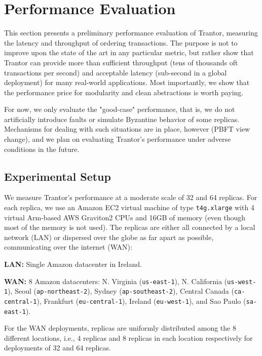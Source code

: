 \documentclass{article}
\begin{document}
\section{Performance Evaluation}
\label{sec:evaluation}

This section presents a preliminary performance evaluation of Trantor, measuring the latency and throughput of ordering transactions.
The purpose is not to improve upon the state of the art in any particular metric,
but rather show that Trantor can provide more than sufficient throughput (tens of thousands oft transactions per second)
and acceptable latency (sub-second in a global deployment) for many real-world applications.
Most importantly, we show that the performance price for modularity and clean abstractions is worth paying.

For now, we only evaluate the "good-case" performance, that is, we do not artificially introduce faults or simulate Byzantine behavior of some replicas.
Mechanisms for dealing with such situations are in place, however (PBFT view change),
and we plan on evaluating Trantor's performance under adverse conditions in the future.

\subsection{Experimental Setup}

We measure Trantor's performance at a moderate scale of 32 and 64 replicas.
For each replica, we use an Amazon EC2 virtual machine of type \texttt{t4g.xlarge}
with 4 virtual Arm-based AWS Graviton2 CPUs and 16GB of memory (even though most of the memory is not used).
The replicas are either all connected by a local network (LAN) or dispersed over the globe as far apart as possible, communicating over the internet (WAN):
\begin{compactitem}
    \item \textbf{LAN:} Single Amazon datacenter in Ireland.
    \item \textbf{WAN:} 8 Amazon datacenters:
    N. Virginia (\texttt{us-east-1}),
    N. California (\texttt{us-west-1}),
    Seoul (\texttt{ap-northeast-2}),
    Sydney (\texttt{ap-southeast-2}),
    Central Canada (\texttt{ca-central-1}),
    Frankfurt (\texttt{eu-central-1}),
    Ireland (\texttt{eu-west-1}),
    and Sao Paulo (\texttt{sa-east-1}).
\end{compactitem}
For the WAN deployments, replicas are uniformly distributed among the 8 different locations,
i.e., 4 replicas and 8 replicas in each location respectively for deployments of 32 and 64 replicas.
\end{document}
